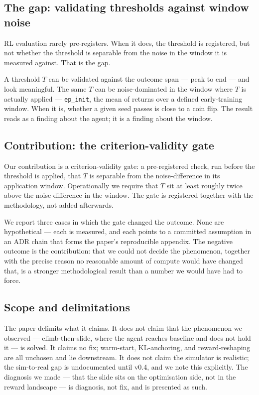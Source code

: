\documentclass{article}
\newcommand{\code}[1]{\texttt{#1}}
\begin{document}
\subsection{The gap: validating thresholds against window noise}
\label{sec:1.2}

RL evaluation rarely pre-registers. When it does, the threshold is registered, but not whether the threshold is separable from the noise in the window it is measured against. That is the gap.

A threshold $T$ can be validated against the outcome span --- peak to end --- and look meaningful. The same $T$ can be noise-dominated in the window where $T$ is actually applied --- \code{ep\_init}, the mean of returns over a defined early-training window. When it is, whether a given seed passes is close to a coin flip. The result reads as a finding about the agent; it is a finding about the window.

\subsection{Contribution: the criterion-validity gate}
\label{sec:1.3}

Our contribution is a criterion-validity gate: a pre-registered check, run before the threshold is applied, that $T$ is separable from the noise-difference in its application window. Operationally we require that $T$ sit at least roughly twice above the noise-difference in the window. The gate is registered together with the methodology, not added afterwards.

We report three cases in which the gate changed the outcome. None are hypothetical --- each is measured, and each points to a committed assumption in an ADR chain that forms the paper's reproducible appendix. The negative outcome is the contribution: that we could not decide the phenomenon, together with the precise reason no reasonable amount of compute would have changed that, is a stronger methodological result than a number we would have had to force.

\subsection{Scope and delimitations}
\label{sec:1.4}

The paper delimits what it claims. It does not claim that the phenomenon we observed --- climb-then-slide, where the agent reaches baseline and does not hold it --- is solved. It claims no fix; warm-start, KL-anchoring, and reward-reshaping are all unchosen and lie downstream. It does not claim the simulator is realistic; the sim-to-real gap is undocumented until v0.4, and we note this explicitly. The diagnosis we made --- that the slide sits on the optimisation side, not in the reward landscape --- is diagnosis, not fix, and is presented as such.
\end{document}
